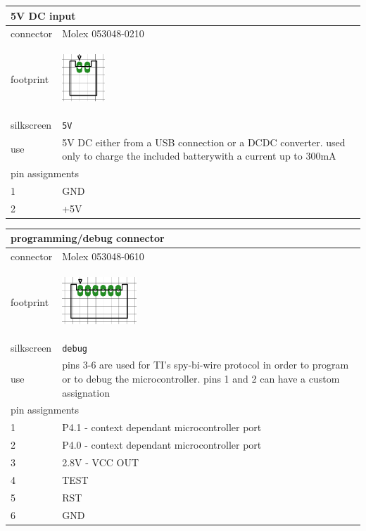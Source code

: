 \documentclass[a4paper,twoside]{refart}
\begin{document}
\begin{tabular}{ |l|p{8cm}| }
    \hline
    \multicolumn{2}{|l|}{5V DC input} \\
    \hline
        connector & Molex 053048-0210 \\
        footprint & \begin{center} \includegraphics[height=50pt]{img/con2} \end{center} \\ \hline
        silkscreen & \verb"5V" \\ \hline
        use & 5V DC either from a USB connection or a DCDC converter. used only to charge the included batterywith a current up to 300mA \\
    \hline
    \multicolumn{2}{|l|}{pin assignments} \\
    \hline
        1   &   GND \\
        2   &   +5V \\
    \hline
\end{tabular}

\begin{tabular}{ |l|p{8cm}| }
    \hline
    \multicolumn{2}{|l|}{programming/debug connector} \\
    \hline
        connector & Molex 053048-0610 \\
        footprint & \begin{center} \includegraphics[height=50pt]{img/con6} \end{center} \\ \hline
        silkscreen & \verb"debug" \\ \hline
        use & pins 3-6 are used for TI's spy-bi-wire protocol in order to program or to debug the microcontroller. pins 1 and 2 can have a custom assignation \\
    \hline
    \multicolumn{2}{|l|}{pin assignments} \\
    \hline
        1   &   P4.1 - context dependant microcontroller port \\
        2   &   P4.0 - context dependant microcontroller port \\
        3   &   2.8V - VCC OUT \\
        4   &   TEST \\
        5   &   RST \\
        6   &   GND \\
    \hline
\end{tabular}
\end{document}
